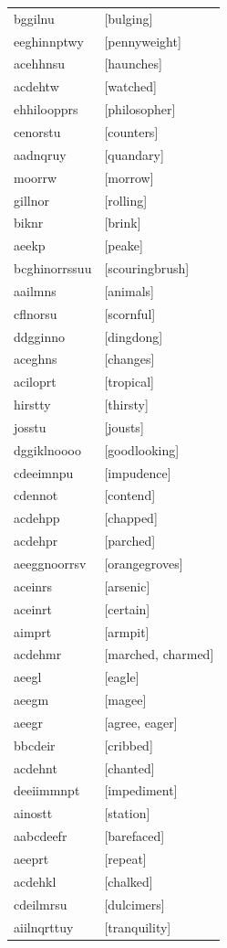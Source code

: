 \documentclass{article}
\begin{document}
\begin{tabular}{ll}
bggilnu & [bulging] \\
eeghinnptwy & [pennyweight] \\
acehhnsu & [haunches] \\
acdehtw & [watched] \\
ehhiloopprs & [philosopher] \\
cenorstu & [counters] \\
aadnqruy & [quandary] \\
moorrw & [morrow] \\
gillnor & [rolling] \\
biknr & [brink] \\
aeekp & [peake] \\
bcghinorrssuu & [scouringbrush] \\
aailmns & [animals] \\
cflnorsu & [scornful] \\
ddgginno & [dingdong] \\
aceghns & [changes] \\
aciloprt & [tropical] \\
hirstty & [thirsty] \\
josstu & [jousts] \\
dggiklnoooo & [goodlooking] \\
cdeeimnpu & [impudence] \\
cdennot & [contend] \\
acdehpp & [chapped] \\
acdehpr & [parched] \\
aeeggnoorrsv & [orangegroves] \\
aceinrs & [arsenic] \\
aceinrt & [certain] \\
aimprt & [armpit] \\
acdehmr & [marched, charmed] \\
aeegl & [eagle] \\
aeegm & [magee] \\
aeegr & [agree, eager] \\
bbcdeir & [cribbed] \\
acdehnt & [chanted] \\
deeiimmnpt & [impediment] \\
ainostt & [station] \\
aabcdeefr & [barefaced] \\
aeeprt & [repeat] \\
acdehkl & [chalked] \\
cdeilmrsu & [dulcimers] \\
aiilnqrttuy & [tranquility] \\

\end{tabular}
\end{document}
